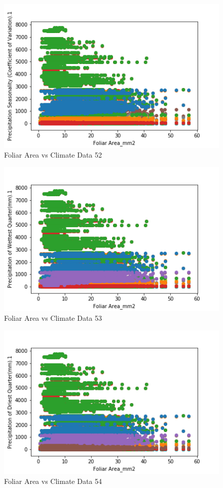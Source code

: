 \documentclass[letterpaper]{article}
\begin{document}
\begin{figure}[h]
\caption{Foliar Area vs Climate Data 52\label{fig:Foliar_Area_vs_52}}
\centering
\includegraphics[width=0.7\paperwidth]{Foliar_Area_vs_52}
\end{figure}


\begin{figure}[h]
\caption{Foliar Area vs Climate Data 53\label{fig:Foliar_Area_vs_53}}
\centering
\includegraphics[width=0.7\paperwidth]{Foliar_Area_vs_53}
\end{figure}


\begin{figure}[h]
\caption{Foliar Area vs Climate Data 54\label{fig:Foliar_Area_vs_54}}
\centering
\includegraphics[width=0.7\paperwidth]{Foliar_Area_vs_54}
\end{figure}
\end{document}
